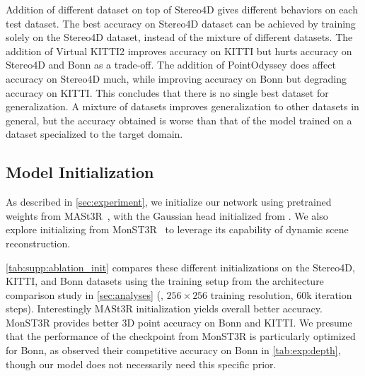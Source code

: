 Addition of different dataset on top of Stereo4D gives different behaviors on each test dataset.
The best accuracy on Stereo4D dataset can be achieved by training solely on the Stereo4D dataset, instead of the mixture of different datasets.
The addition of Virtual KITTI2 improves accuracy on KITTI but hurts accuracy on Stereo4D and Bonn as a trade-off. 
The addition of PointOdyssey does affect accuracy on Stereo4D much, while improving accuracy on Bonn but degrading accuracy on KITTI.
This concludes that there is no single best dataset for generalization.
A mixture of datasets improves generalization to other datasets in general, but the accuracy obtained is worse than that of the model trained on a dataset specialized to the target domain.



\subsection{Model Initialization}
\label{supp:model_init}
As described in \cref{sec:experiment}, we initialize our network using pretrained weights from MASt3R~\citep{Leroy:2024:GIM}, with the Gaussian head initialized from \cite{Ye:2025:NPN}. 
We also explore initializing from MonST3R~\citep{Zhang:2025:MST} to leverage its capability of dynamic scene reconstruction.

\cref{tab:supp:ablation_init} compares these different initializations on the Stereo4D, KITTI, and Bonn datasets using the training setup from the architecture comparison study in \cref{sec:analyses} (\ie, $256\times256$ training resolution, 60k iteration steps).
Interestingly MASt3R initialization yields overall better accuracy.
MonST3R provides better 3D point accuracy on Bonn and KITTI.
We presume that the performance of the checkpoint from MonST3R is particularly optimized for Bonn, as observed their competitive accuracy on Bonn in \cref{tab:exp:depth}, though our model does not necessarily need this specific prior.



